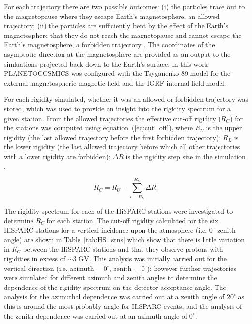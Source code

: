 For each trajectory there are two possible outcomes: (i) the particles trace out to the magnetopause where they escape Earth's magnetosphere, an allowed trajectory; (ii) the particles are sufficiently bent by the effect of the Earth's magnetosphere that they do not reach the magnetopause and cannot escape the Earth's magnetosphere, a forbidden trajectory \citep{desorgher_planetocosmics_2006}. The coordinates of the asymptotic direction at the magnetosphere are provided as an output to the simluations projected back down to the Earth's surface. In this work PLANETOCOSMICS was configured with the Tsyganenko-89 model for the external magnetospheric magnetic field and the IGRF internal field model.

For each rigidity simulated, whether it was an allowed or forbidden trajectory was stored, which was used to provide an insight into the rigidity spectrum for a given station. From the allowed trajectories the effective cut-off rigidity ($R_C$) for the stations was computed using equation~(\ref{eq:cut_off}), where $R_U$ is the upper rigidity (the last allowed trajectory before the first forbidden trajectory); $R_L$ is the lower rigidity (the last allowed trajectory before which all other trajectories with a lower rigidity are forbidden); $\Delta R$ is the rigidity step size in the simulation \citep{desorgher_planetocosmics_2006, herbst_influence_2013}.

\begin{equation}
\label{eq:cut_off}
R_C = R_U - \sum_{i = R_L}^{R_U} \Delta R_i
\end{equation}

The rigidity spectrum for each of the HiSPARC stations were investigated to determine $R_C$ for each station. The cut-off rigidity calculated for the six HiSPARC stations for a vertical incidence upon the atmosphere (i.e. $0^\circ$ zenith angle) are shown in Table~\ref{tab:HS_stns} which show that there is little variation in $R_C$ between the HiSPARC stations and that they observe protons with rigidities in excess of $\sim 3$ GV. This analysis was initially carried out for the vertical direction (i.e. azimuth = $0^\circ$, zenith = $0^\circ$); however further trajectories were simulated for different azimuth and zenith angles to determine the dependence of the rigidity spectrum on the detector acceptance angle. The analysis for the azimuthal dependence was carried out at a zenith angle of $20^\circ$ as this is around the most probably angle for HiSPARC events, and the analysis of the zenith dependence was carried out at an azimuth angle of $0^\circ$.


